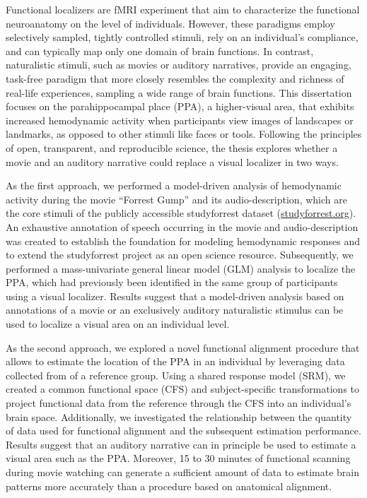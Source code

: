 Functional localizers are fMRI experiment that aim to characterize the
functional neuroanatomy on the level of individuals.
%
However, these paradigms employ selectively sampled, tightly controlled
stimuli, rely on an individual's compliance, and can typically map only one
domain of brain functions.
In contrast, naturalistic stimuli, such as movies or auditory narratives,
provide an engaging, task-free paradigm that more closely resembles the
complexity and richness of real-life experiences, sampling a wide range of
brain functions.
This dissertation focuses on the parahippocampal place (PPA), a higher-visual
area, that exhibits increased hemodynamic activity when participants view
images of landscapes or landmarks, as opposed to other stimuli like faces or
tools.
Following the principles of open, transparent, and reproducible science, the
thesis explores whether a movie and an auditory narrative could replace a
visual localizer in two ways.

As the first approach, we performed a model-driven analysis of hemodynamic
activity during the movie ``Forrest Gump'' and its audio-description, which are
the core stimuli of the publicly accessible studyforrest dataset
(\href{www.studyforrest.org}{\url{studyforrest.org}}).
%
An exhaustive annotation of speech occurring in the movie and audio-description
was created to establish the foundation for modeling hemodynamic responses and
to extend the studyforrest project as an open science resource.
Subsequently, we performed a mass-univariate general linear model (GLM)
analysis to localize the PPA, which had previously been identified in the same
group of participants using a visual localizer.
Results suggest that a model-driven analysis based on annotations of a movie or
an exclusively auditory naturalistic stimulus can be used to localize a
visual area on an individual level.

As the second approach, we explored a novel functional alignment procedure that
allows to estimate the location of the PPA in an individual by leveraging data
collected from of a reference group.
%
Using a shared response model (SRM), we created a common functional space (CFS)
and subject-specific transformations to project functional data from the
reference through the CFS into an individual's brain space.
%
Additionally, we investigated the relationship between the quantity of data used
for functional alignment and the subsequent estimation performance.
%
Results suggest that an auditory narrative can in principle be used to estimate
a visual area such as the PPA.
%
Moreover, 15 to 30 minutes of functional scanning during movie watching can
generate a sufficient amount of data to estimate brain patterns
more accurately than a procedure based on anatomical alignment.


